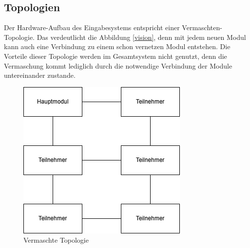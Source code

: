  
 \subsection{Topologien}
 Der Hardware-Aufbau des Eingabesystems entspricht einer Vermaschten-Topologie. Das verdeutlicht die Abbildung \ref{vision}, denn mit jedem neuen Modul kann auch eine Verbindung zu einem schon vernetzen Modul entstehen. Die Vorteile dieser Topologie werden im Gesamtsystem nicht genutzt, denn die Vermaschung kommt lediglich durch die notwendige Verbindung der Module untereinander zustande.\\
\begin{figure}[H]
	\centering    
	\includegraphics[width=.75\textwidth]{Bilder/vermaschte_topologie.png}
	\caption{Vermaschte Topologie}
	\label{vermaschte_topologie}
\end{figure}
 

